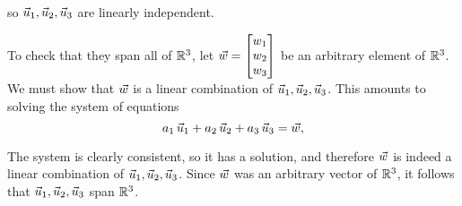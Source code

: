 \documentclass{ximera}
\begin{document}
\begin{exploration}
\begin{solution}
  so $\vec{u}_1,\vec{u}_2,\vec{u}_3$ are linearly independent.


  To check that they span all of\/ $\mathbb{R}^3$, let $\vec{w}=\begin{bmatrix} w_1 \\ w_2 \\ w_3 \end{bmatrix}$
  be an arbitrary element of\/ $\mathbb{R}^3$. We must show that $\vec{w}$ is a linear
  combination of $\vec{u}_1,\vec{u}_2,\vec{u}_3$. This amounts to
  solving the system of equations
  \begin{equation*}
    a_1\,\vec{u}_1+a_2\,\vec{u}_2+a_3\,\vec{u}_3 = \vec{w},
  \end{equation*}
  
  The system is clearly consistent, so it has a solution, and
  therefore $\vec{w}$ is indeed a linear combination of
  $\vec{u}_1,\vec{u}_2,\vec{u}_3$. Since $\vec{w}$ was an
  arbitrary vector of\/ $\mathbb{R}^3$, it follows that
  $\vec{u}_1,\vec{u}_2,\vec{u}_3$ span $\mathbb{R}^3$.
\end{solution}


\end{exploration}
\end{document}

